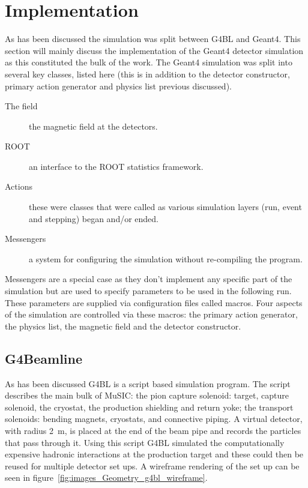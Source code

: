 \section{Implementation} %
\label{cha:implementation}
As has been discussed the simulation was split between G4BL and Geant4. This section will mainly discuss the implementation of the Geant4 detector simulation as this constituted the bulk of the work. The Geant4 simulation was split into several key classes, listed here (this is in addition to the detector constructor, primary action generator and physics list previous discussed).
\begin{description}
  \item[The field] the magnetic field at the detectors.
  \item[ROOT] an interface to the ROOT statistics framework.
  \item[Actions] these were classes that were called as various simulation layers (run, event and stepping) began and/or ended.
  \item[Messengers] a system for configuring the simulation without re-compiling the program.
\end{description}
Messengers are a special case as they don't implement any specific part of the simulation but are used to specify parameters to be used in the following run. These parameters are supplied via configuration files called macros. Four aspects of the simulation are controlled via these macros: the primary action generator, the physics list, the magnetic field and the detector constructor. 
\subsection{G4Beamline} %
\label{sec:g4beamline_impl}
As has been discussed G4BL is a script based simulation program. The script describes the main bulk of MuSIC: the pion capture solenoid: target, capture solenoid, the cryostat, the production shielding and return yoke; the transport solenoids: bending magnets, cryostats, and connective piping. A virtual detector, with radius 2~m, is placed at the end of the beam pipe and records the particles that pass through it. Using this script G4BL simulated the computationally expensive hadronic interactions at the production target and these could then be reused for multiple detector set ups. A wireframe rendering of the set up can be seen in figure~\ref{fig:images_Geometry_g4bl_wireframe}. 

